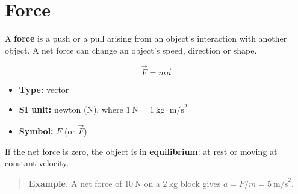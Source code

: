 
\section*{Force}

A \textbf{force} is a push or a pull arising from an object's interaction
with another object. A net force can change an object's speed, direction
or shape.

\begin{equation}
  \vec{F} = m\vec{a}
\end{equation}

\begin{itemize}
  \item \textbf{Type:} vector
  \item \textbf{SI unit:} newton (N), where
        $1\ \text{N} = 1\ \text{kg}\cdot\text{m/s}^{2}$
  \item \textbf{Symbol:} $F$ (or $\vec{F}$)
\end{itemize}

If the net force is zero, the object is in \textbf{equilibrium}: at rest
or moving at constant velocity.

\begin{quote}
\textbf{Example.} A net force of $10\ \text{N}$ on a $2\ \text{kg}$ block
gives $a = F/m = 5\ \text{m/s}^{2}$.
\end{quote}
